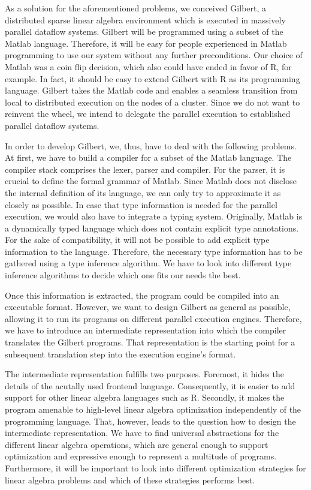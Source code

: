As a solution for the aforementioned problems, we conceived Gilbert, a distributed sparse linear algebra environment which is executed in massively parallel dataflow systems.
Gilbert will be programmed using a subset of the Matlab language.
Therefore, it will be easy for people experienced in Matlab programming to use our system without any further preconditions.
Our choice of Matlab was a coin flip decision, which also could have ended in favor of R, for example.
In fact, it should be easy to extend Gilbert with R as its programming language.
Gilbert takes the Matlab code and enables a seamless transition from local to distributed execution on the nodes of a cluster.
Since we do not want to reinvent the wheel, we intend to delegate the parallel execution to established parallel dataflow systems.

In order to develop Gilbert, we, thus, have to deal with the following problems.
At first, we have to build a compiler for a subset of the Matlab language.
The compiler stack comprises the lexer, parser and compiler.
For the parser, it is crucial to define the formal grammar of Matlab.
Since Matlab does not disclose the internal definition of its language, we can only try to approximate it as closely as possible.
In case that type information is needed for the parallel execution, we would also have to integrate a typing system.
Originally, Matlab is a dynamically typed language which does not contain explicit type annotations.
For the sake of compatibility, it will not be possible to add explicit type information to the language.
Therefore, the necessary type information has to be gathered using a type inference algorithm.
We have to look into different type inference algorithms to decide which one fits our needs the best.

Once this information is extracted, the program could be compiled into an executable format.
However, we want to design Gilbert as general as possible, allowing it to run its programs on different parallel execution engines.
Therefore, we have to introduce an intermediate representation into which the compiler translates the Gilbert programs.
That representation is the starting point for a subsequent translation step into the execution engine's format.

The intermediate representation fulfills two purposes.
Foremost, it hides the details of the acutally used frontend language.
Consequently, it is easier to add support for other linear algebra languages such as R.
Secondly, it makes the program amenable to high-level linear algebra optimization independently of the programming language.
That, however, leads to the question how to design the intermediate representation.
We have to find universal abstractions for the different linear algebra operations, which are general enough to support optimization and expressive enough to represent a multitude of programs.
Furthermore, it will be important to look into different optimization strategies for linear algebra problems and which of these strategies performs best.

